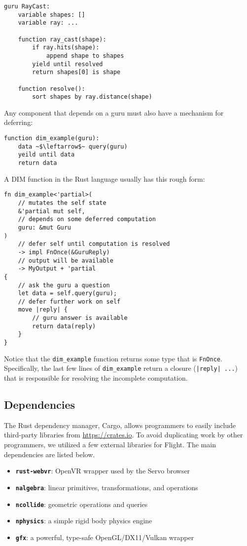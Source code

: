 \documentclass[conference,12pt]{IEEEtran}
\begin{document}
\begin{verbatim}
guru RayCast:
    variable shapes: []
    variable ray: ...

    function ray_cast(shape):
        if ray.hits(shape):
            append shape to shapes
        yield until resolved
        return shapes[0] is shape

    function resolve():
        sort shapes by ray.distance(shape)
\end{verbatim}

Any component that depends on a guru must also have a mechanism for deferring:

\begin{verbatim}
function dim_example(guru):
    data ~$\leftarrow$~ query(guru)
    yeild until data
    return data
\end{verbatim}

A DIM function in the Rust language usually has this rough form:

\begin{verbatim}
fn dim_example<'partial>(
    // mutates the self state
    &'partial mut self,
    // depends on some deferred computation
    guru: &mut Guru
)
    // defer self until computation is resolved
    -> impl FnOnce(&GuruReply)
    // output will be available
    -> MyOutput + 'partial
{
    // ask the guru a question
    let data = self.query(guru);
    // defer further work on self
    move |reply| {
        // guru answer is available
        return data(reply)
    }
}
\end{verbatim}

Notice that the \texttt{dim\_example} function returns some type that is
\texttt{FnOnce}. Specifically, the last few lines of \texttt{dim\_example}
return a closure (\texttt{|reply| ...}) that is responsible for
resolving the incomplete computation.

\subsection{Dependencies}

The Rust dependency manager, Cargo, allows programmers to easily include
third-party libraries from \url{https://crates.io}. To avoid duplicating work
by other programmers, we utilized a few external libraries for Flight. The main
dependencies are listed below.
\begin{itemize}
    \item \textbf{\texttt{rust-webvr}}: OpenVR wrapper used by the Servo browser
    \item \textbf{\texttt{nalgebra}}: linear primitives, transformations, and
        operations
    \item \textbf{\texttt{ncollide}}: geometric operations and queries
    \item \textbf{\texttt{nphysics}}: a simple rigid body physics engine
    \item \textbf{\texttt{gfx}}: a powerful, type-safe OpenGL/DX11/Vulkan
        wrapper
\end{itemize}
\end{document}
